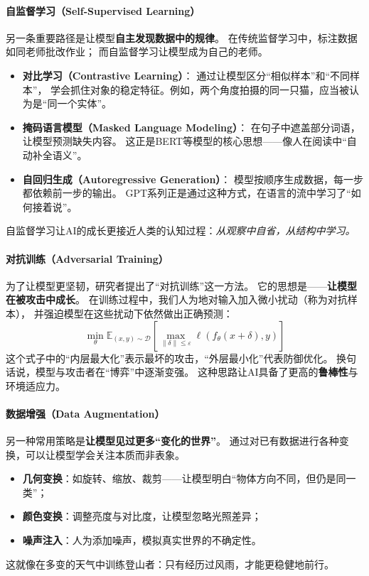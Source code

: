 \paragraph{自监督学习（Self-Supervised Learning）}  
另一条重要路径是让模型\textbf{自主发现数据中的规律}。  
在传统监督学习中，标注数据如同老师批改作业；  
而自监督学习让模型成为自己的老师。  

\begin{itemize}
\item \textbf{对比学习（Contrastive Learning）}：  
  通过让模型区分“相似样本”和“不同样本”，  
  学会抓住对象的稳定特征。例如，两个角度拍摄的同一只猫，应当被认为是“同一个实体”。  

\item \textbf{掩码语言模型（Masked Language Modeling）}：  
  在句子中遮盖部分词语，让模型预测缺失内容。  
  这正是BERT等模型的核心思想——像人在阅读中“自动补全语义”。  

\item \textbf{自回归生成（Autoregressive Generation）}：  
  模型按顺序生成数据，每一步都依赖前一步的输出。  
  GPT系列正是通过这种方式，在语言的流中学习了“如何接着说”。  
\end{itemize}
自监督学习让AI的成长更接近人类的认知过程：\textit{从观察中自省，从结构中学习。}

\paragraph{对抗训练（Adversarial Training）}  
为了让模型更坚韧，研究者提出了“对抗训练”这一方法。  
它的思想是——\textbf{让模型在被攻击中成长}。  
在训练过程中，我们人为地对输入加入微小扰动（称为对抗样本），  
并强迫模型在这些扰动下依然做出正确预测：  
$$\min_\theta \mathbb{E}_{(x,y) \sim \mathcal{D}} \left[ \max_{\|\delta\| \leq \varepsilon} \ell(f_\theta(x + \delta), y) \right]$$  
这个式子中的“内层最大化”表示最坏的攻击，“外层最小化”代表防御优化。  
换句话说，模型与攻击者在“博弈”中逐渐变强。  
这种思路让AI具备了更高的\textbf{鲁棒性}与环境适应力。

\paragraph{数据增强（Data Augmentation）}  
另一种常用策略是\textbf{让模型见过更多“变化的世界”}。  
通过对已有数据进行各种变换，可以让模型学会关注本质而非表象。  

\begin{itemize}
\item \textbf{几何变换}：如旋转、缩放、裁剪——让模型明白“物体方向不同，但仍是同一类”；  
\item \textbf{颜色变换}：调整亮度与对比度，让模型忽略光照差异；  
\item \textbf{噪声注入}：人为添加噪声，模拟真实世界的不确定性。  
\end{itemize}
这就像在多变的天气中训练登山者：只有经历过风雨，才能更稳健地前行。

